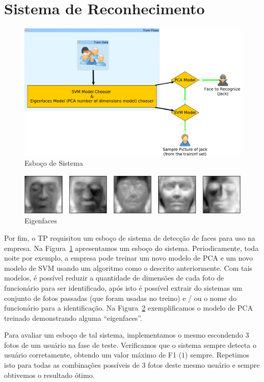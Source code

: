 \documentclass[brazil,a4paper,12pt]{article}
\begin{document}
\section{Sistema de Reconhecimento}

\begin{figure}
\centering
\includegraphics[scale=0.6]{sys-crop.pdf}
\caption{Esboço de Sistema}
\label{fig:sys}
\end{figure}

\begin{figure}
\centering
\includegraphics[scale=0.6]{eig-crop.pdf}
\caption{Eigenfaces}
\label{fig:eig}
\end{figure}

Por fim, o TP requisitou um esboço de sistema de detecção de faces para uso na
empresa. Na Figura~\ref{fig:sys} apresentamos um esboço do sistema. Periodicamente,
toda noite por exemplo, a empresa pode treinar um novo modelo de PCA e um novo modelo
de SVM usando um algoritmo como o descrito anteriormente. Com tais modelos, é possível
reduzir a quantidade de dimensões de cada foto de funcionário para ser identificado,
após isto é possível extrair do sistemas um conjunto de fotos passadas (que foram
usadas no treino) e / ou o nome do funcionário para a identificação. Na Figura~\ref{fig:eig} 
exemplificamos o modelo de PCA treinado demonstrando alguma ``eigenfaces''.

Para avaliar um esboço de tal sistema, implementamos o mesmo escondendo 3 fotos de um usuário
na fase de teste. Verificamos que o sistema sempre detecta o usuário corretamente, obtendo
um valor máximo de F1 ($1$) sempre. Repetimos isto para todas as combinações possíveis de 3
fotos deste mesmo usuário e sempre obtivemos o resultado ótimo.



\end{document}

